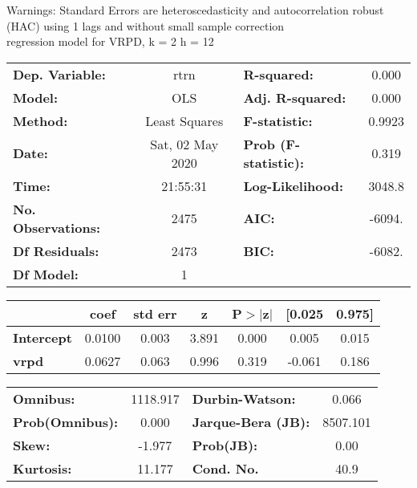 Warnings: \newline
 [1] Standard Errors are heteroscedasticity and autocorrelation robust (HAC) using 1 lags and without small sample correction\\ 

regression model for VRPD, k = 2 h = 12\begin{center}
\begin{tabular}{lclc}
\toprule
\textbf{Dep. Variable:}    &       rtrn       & \textbf{  R-squared:         } &     0.000   \\
\textbf{Model:}            &       OLS        & \textbf{  Adj. R-squared:    } &     0.000   \\
\textbf{Method:}           &  Least Squares   & \textbf{  F-statistic:       } &    0.9923   \\
\textbf{Date:}             & Sat, 02 May 2020 & \textbf{  Prob (F-statistic):} &    0.319    \\
\textbf{Time:}             &     21:55:31     & \textbf{  Log-Likelihood:    } &    3048.8   \\
\textbf{No. Observations:} &        2475      & \textbf{  AIC:               } &    -6094.   \\
\textbf{Df Residuals:}     &        2473      & \textbf{  BIC:               } &    -6082.   \\
\textbf{Df Model:}         &           1      & \textbf{                     } &             \\
\bottomrule
\end{tabular}
\begin{tabular}{lcccccc}
                   & \textbf{coef} & \textbf{std err} & \textbf{z} & \textbf{P$> |$z$|$} & \textbf{[0.025} & \textbf{0.975]}  \\
\midrule
\textbf{Intercept} &       0.0100  &        0.003     &     3.891  &         0.000        &        0.005    &        0.015     \\
\textbf{vrpd}      &       0.0627  &        0.063     &     0.996  &         0.319        &       -0.061    &        0.186     \\
\bottomrule
\end{tabular}
\begin{tabular}{lclc}
\textbf{Omnibus:}       & 1118.917 & \textbf{  Durbin-Watson:     } &    0.066  \\
\textbf{Prob(Omnibus):} &   0.000  & \textbf{  Jarque-Bera (JB):  } & 8507.101  \\
\textbf{Skew:}          &  -1.977  & \textbf{  Prob(JB):          } &     0.00  \\
\textbf{Kurtosis:}      &  11.177  & \textbf{  Cond. No.          } &     40.9  \\
\bottomrule
\end{tabular}
\end{center}

